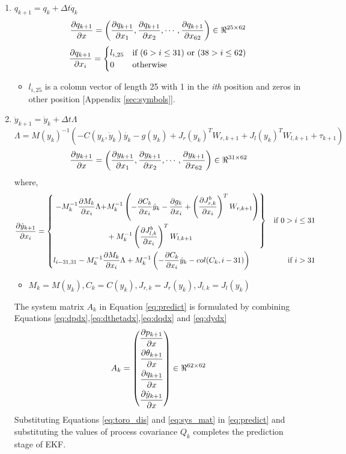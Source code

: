 \begin{enumerate}
\item $q_{k+1} = q_k + \Delta t \dot{q}_k $
\begin{equation}
\label{eq:dqdx}
\frac{\partial {q_{k+1}}}{\partial {x}} = \left(\frac{\partial {q_{k+1}}}{\partial {x_{1}}}, \frac{\partial {q_{k+1}}}{\partial {x_{2}}}, \cdots , \frac{\partial {q_{k+1}}}{\partial {x_{62}}}\right) \in \Re^{25 \times 62}
\end{equation}
\[
\frac{\partial {q_{k+1}}}{\partial {x_{i}}} = 
	\begin{cases}
	l_{i,25} & \text{if } (6 > i \leq 31) \text{ or } (38 > i \leq 62) \\
	0 & \text{otherwise}   \\
	\end{cases}
\]
\begin{itemize}
\item $l_{i,25}$ is a colomn vector of length 25 with 1 in the \emph{ith} position and zeros in other position [Appendix \ref{sec:symbols}].
\end{itemize}
\item $\dot{y}_{k+1} = \dot{y}_{k}+ \Delta t \Lambda $
$$\Lambda = M(y_k)^{-1}(-C(y_k,\dot{y}_k)\dot{y_k} - g(y_k) + J_r(y_k)^{T}W_{r,k+1} +J_l(y_k)^{T}W_{l,k+1} + \tau_{k+1})$$
 \begin{equation}
 \label{eq:dydx}
\frac{\partial {y_{k+1}}}{\partial {x}} = \left(\frac{\partial {y_{k+1}}}{\partial {x_{1}}}, \frac{\partial {y_{k+1}}}{\partial {x_{2}}}, \cdots , \frac{\partial {y_{k+1}}}{\partial {x_{62}}}\right) \in \Re^{31 \times 62}
\end{equation}
where,
\[
\frac{\partial {\dot{y}_{k+1}}}{\partial {x_{i}}} = 
\left\{ 
\!\begin{aligned}
	& \left. \!\begin{aligned}
	-M_k^{-1}\frac{\partial {M_k}}{\partial {x_{i}}}\Lambda + &M_k^{-1}\left(-\frac{\partial {C_k}}{\partial {x_{i}}}\dot{y}_k -\frac{\partial {g_k}}{\partial {x_{i}}}        + \left(\frac{\partial {J_{r,k}^{b}}}{\partial {x_{i}}}\right)^{T}W_{r,k+1}\right) \\
	& + M_k^{-1}\left(\frac{\partial {J_{l,k}^{b}}}{\partial {x_{i}}}\right)^{T}W_{l,k+1}
	\end{aligned} \right\}& \text{if } 0 > i \leq 31 \\
&l_{i-31,31}-M_k^{-1}\frac{\partial {M_k}}{\partial {x_{i}}}\Lambda + M_k^{-1}\left(-\frac{\partial {C_k}}{\partial {x_{i}}}\dot{y}_k- col(C_k,i-31)\right) & \text{if } i > 31  \\
\end{aligned}
\right.
\]
\begin{itemize}
\item $M_k= M(y_k),C_k=C(y_k),J_{r,k}=J_r(y_k),J_{l,k}=J_l(y_k)$
\end{itemize}
The system matrix $A_k$ in Equation \ref{eq:predict} is formulated by combining Equations \ref{eq:dpdx},\ref{eq:dthetadx},\ref{eq:dqdx} and \ref{eq:dydx}
\begin{equation}
\label{eq:sys_mat}
A_k = \left(
\begin{aligned}
\frac{\partial {p_{k+1}}}{\partial {x}} \\
\frac{\partial {\theta_{k+1}}}{\partial {x}} \\
\frac{\partial {q_{k+1}}}{\partial {x}}\\
\frac{\partial {\dot{y}_{k+1}}}{\partial {x}}
\end{aligned} \right)
\in \Re^{62 \times 62}
\end{equation}
Substituting Equations \ref{eq:toro_dis} and \ref{eq:sys_mat} in \ref{eq:predict} and substituting the values of process covariance $Q_k$ completes the prediction stage of EKF.


\end{enumerate}
